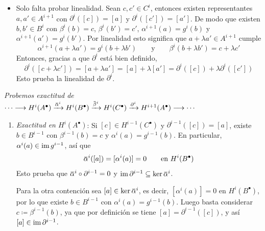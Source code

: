\begin{sol}
\begin{itemize}
    Afirmamos que $a-a'=f^i(l)$. En efecto, como $\alpha^{i+1}\circ f^i=g^i\circ\alpha^i$ y $g^i\circ g^{i-1}=0$:
    \[
    \alpha^{i+1}(f^i(l))
    =g^i(\alpha^i(l))
    =g^i(\Delta b - g^{i-1}(k))
    =g^i(\Delta b).
    \]
    Sin embargo,
    \[
    g^i(\Delta b)=g^i(b)-g^i(b')
    =\alpha^{i+1}(a)-\alpha^{i+1}(a')
    =\alpha^{i+1}(a-a'),
    \]
    así $\alpha^{i+1}(f^i(l))=\alpha^{i+1}(a-a')$; como $\alpha^{i+1}$ es inyectiva, $f^i(l)=a-a'$. Esto prueba $[a]=[a']$ en $H^{i+1}(A^{\bullet})$ y $\partial^i$ está bien definida como función.

    \item Solo falta probar linealidad. Sean $c,c'\in C^i$, entonces existen representantes $a,a'\in A^{i+1}$ con $\partial^i([c])=[a]$ y $\partial^i([c'])=[a']$. De modo que existen $b,b'\in B^i$ con $\beta^i(b)=c$, $\beta^i(b')=c'$, $\alpha^{i+1}(a)=g^i(b)$ y $\alpha^{i+1}(a')=g^i(b')$. Por linealidad esto significa que $a+\lambda a'\in A^{i+1}$ cumple
    \[
    \alpha^{i+1}(a+\lambda a')=g^i(b+\lambda b')
    \qquad\text{y}\qquad
    \beta^i(b+\lambda b')=c+\lambda c'
    \]
    Entonces, gracias a que $\partial^i$ está bien definido,
    \[
    \partial^i([c+\lambda c'])=[a+\lambda a']
    =[a]+\lambda[a']
    =\partial^i([c])+\lambda\partial^i([c'])
    \]
    Esto prueba la linealidad de $\partial^i$.
\end{itemize}
%
\emph{Probemos exactitud de
\(
\cdots\longrightarrow H^i(A^{\bullet})
\xrightarrow{\ubar\alpha^i}H^i(B^{\bullet})
\xrightarrow{\ubar\beta^i}H^i(C^{\bullet})
\xrightarrow{\partial^i}H^{i+1}(A^{\bullet})
\longrightarrow\cdots
\)
}
\begin{enumerate}
    \item \emph{Exactitud en $H^i(A^{\bullet})$}: Si $[c]\in H^{i-1}(C^{\bullet})$ y $\partial^{i-1}([c])=[a]$, existe $b\in B^{i-1}$ con $\beta^{i-1}(b)=c$ y $\alpha^i(a)=g^{i-1}(b)$. En particular, $\alpha^i(a)\in\operatorname{im} g^{i-1}$, así que
    \[
    \ubar\alpha^i([a])=[\alpha^i(a)]=0
    \qquad\text{en }H^i(B^{\bullet})
    \]
    Esto prueba que $\ubar\alpha^i\circ\partial^{i-1}=0$ y $\im\partial^{i-1}\subseteq\ker\ubar\alpha^i$.

    Para la otra contención sea $[a]\in\ker\ubar\alpha^i$, es decir, $[\alpha^i(a)]=0$ en $H^i(B^{\bullet})$, por lo que existe $b\in B^{i-1}$ con $\alpha^i(a)=g^{i-1}(b)$. Luego basta considerar $c\coloneq\beta^{i-1}(b)$, ya que por definición se tiene $[a]=\partial^{i-1}([c])$, y así $[a]\in\operatorname{im}\partial^{i-1}$.


\end{enumerate}
\end{sol}
